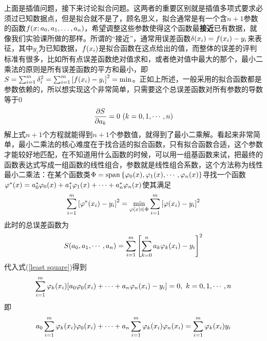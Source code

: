 \documentclass[12pt,a4paper,openany,twoside]{book}
\numberwithin{equation}{section}
\begin{document}
            上面是插值问题，接下来讨论拟合问题。这两者的重要区别就是插值多项式要求必须过已知数据点，但是拟合就不是了，顾名思义，拟合通常是有一个含$n+1$参数的函数$f\qty(x;a_0,a_1,\dots,a_n)$，希望调整这些参数使得这个函数最\textbf{接近}已有数据，就像我们实验课所做的那样。所谓的“接近”，通常用误差函数$\delta\qty(x_i)=f\qty(x_i)-y_i$来表征，其中$y_i$为已知数据，$f\qty(x_i)$是拟合函数在这点给出的值，而整体的误差的评判标准有很多，比如所有点误差函数绝对值求和，或者绝对值中最大的那个，最小二乘法的原则是所有误差函数的平方和最小，即$S=\sum_{i=1}^m{\delta_i^2}=\sum_{i=1}^m{\qty[f\qty(x_{i})-y_{i}]^{2}}=\min$。正如上所述，一般采用的拟合函数都是参数依赖的，所以想实现这个非常简单，只需要这个总误差函数对所有参数的导数等于0
            \begin{equation}
              \pdv{S}{a_k}=0\ \qty(k=0,1, \cdots, n)
              \label{least square}
            \end{equation}
            解上式$n+1$个方程就能得到$n+1$个参数值，就得到了最小二乘解。看起来非常简单，最小二乘法的核心难度在于找合适的拟合函数，只有拟合函数合适，这个参数才能较好地匹配，在不知道用什么函数的时候，可以用一组基函数来试，把最终的函数表达式写成一组函数的线性组合，参数就是线性组合系数，这个方法称为线性最小二乘法：在某个函数类$\Phi=\operatorname{span}\qty{\varphi_0\qty(x),\varphi_1\qty(x),\cdots,\varphi_n\qty(x)}$寻找一个函数$\varphi^*\qty(x)=a_0^*\varphi_0\qty(x)+a_1^* \varphi_1\qty(x)+\cdots+a_n^*\varphi_n\qty(x)$使其满足
            \begin{equation}
              \sum_{i=1}^m{\qty[\varphi^*\qty(x_i)-y_i]^2}=\min_{\varphi\qty(x) \in \Phi}\sum_{i=1}^m{\qty[\varphi\qty(x_i)-y_i]^2}
            \end{equation}
            此时的总误差函数为
            \begin{equation}
              S\qty(a_0,a_1,\cdots,a_n)=\sum_{i=1}^m{\qty[\sum_{k=0}^n{a_k\varphi_k\qty(x_i)}-y_i]^2}
            \end{equation}
            代入式(\ref{least square})得到
            \begin{equation}
              \sum_{i=1}^m{\varphi_k\qty(x_i)\qty[a_0\varphi_0\qty(x_i)+\cdots+a_n\varphi_n\qty(x_i)-y_i]}=0,\ k=0,1,\cdots,n
            \end{equation}
            即
            \begin{equation}
              a_0\sum_{i=1}^m{\varphi_k\qty(x_i)\varphi_0\qty(x_i)}+\cdots+a_n\sum_{i=1}^m{\varphi_k\qty(x_i)\varphi_n\qty(x_i)}=\sum_{i=1}^m{\varphi_k\qty(x_i)y_i}
            \end{equation}
\end{document}
